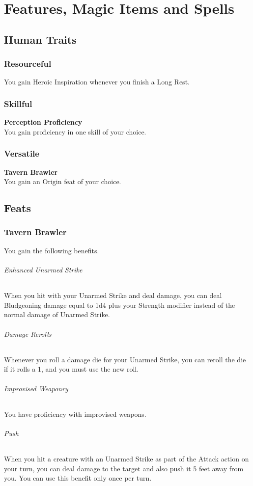 \documentclass[letterpaper,openany,oneside,twocolumn]{book}
\begin{document}
\onecolumn


\rendercharactersheet

\renderbackgroundsheet

\renderspellsheet


\restoregeometry
\twocolumn

\chapter*{Features, Magic Items and Spells}

\section*{Human Traits}
\subsection*{Resourceful}
You gain Heroic Inspiration whenever you finish a Long Rest.
\subsection*{Skillful}
\textbf{Perception Proficiency}\\
You gain proficiency in one skill of your choice.
\subsection*{Versatile}
\textbf{Tavern Brawler}\\
You gain an Origin feat of your choice.

\section*{Feats}
\subsection*{Tavern Brawler}
You gain the following benefits.
\subparagraph*{Enhanced Unarmed Strike} When you hit with your Unarmed Strike and deal damage, you can deal Bludgeoning damage equal to 1d4 plus your Strength modifier instead of the normal damage of Unarmed Strike.
\subparagraph*{Damage Rerolls} Whenever you roll a damage die for your Unarmed Strike, you can reroll the die if it rolls a 1, and you must use the new roll.
\subparagraph*{Improvised Weaponry} You have proficiency with improvised weapons.
\subparagraph*{Push} When you hit a creature with an Unarmed Strike as part of the Attack action on your turn, you can deal damage to the target and also push it 5 feet away from you. You can use this benefit only once per turn.
\end{document}
